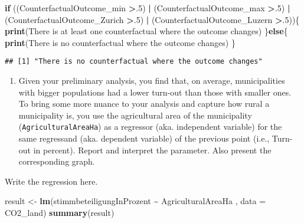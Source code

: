 \documentclass[
]{book}
\newenvironment{Shaded}{\begin{snugshade}}{\end{snugshade}}
\newcommand{\AttributeTok}[1]{\textcolor[rgb]{0.13,0.29,0.53}{#1}}
\newcommand{\ControlFlowTok}[1]{\textcolor[rgb]{0.13,0.29,0.53}{\textbf{#1}}}
\newcommand{\DecValTok}[1]{\textcolor[rgb]{0.00,0.00,0.81}{#1}}
\newcommand{\FunctionTok}[1]{\textcolor[rgb]{0.13,0.29,0.53}{\textbf{#1}}}
\newcommand{\NormalTok}[1]{#1}
\newcommand{\OtherTok}[1]{\textcolor[rgb]{0.56,0.35,0.01}{#1}}
\newcommand{\SpecialCharTok}[1]{\textcolor[rgb]{0.81,0.36,0.00}{\textbf{#1}}}
\newcommand{\StringTok}[1]{\textcolor[rgb]{0.31,0.60,0.02}{#1}}
\providecommand{\tightlist}{%
  \setlength{\itemsep}{0pt}\setlength{\parskip}{0pt}}
\begin{document}
\begin{Shaded}
\begin{Highlighting}[]
\ControlFlowTok{if}\NormalTok{ ((CounterfactualOutcome\_min }\SpecialCharTok{\textgreater{}}\NormalTok{.}\DecValTok{5}\NormalTok{) }\SpecialCharTok{|}\NormalTok{ (CounterfactualOutcome\_max }\SpecialCharTok{\textgreater{}}\NormalTok{.}\DecValTok{5}\NormalTok{) }\SpecialCharTok{|}\NormalTok{ (CounterfactualOutcome\_Zurich }\SpecialCharTok{\textgreater{}}\NormalTok{.}\DecValTok{5}\NormalTok{) }\SpecialCharTok{|}\NormalTok{ (CounterfactualOutcome\_Luzern }\SpecialCharTok{\textgreater{}}\NormalTok{.}\DecValTok{5}\NormalTok{))\{}
  \FunctionTok{print}\NormalTok{(}\StringTok{\textquotesingle{}There is at least one counterfactual where the outcome changes\textquotesingle{}}\NormalTok{)}
\NormalTok{\}}\ControlFlowTok{else}\NormalTok{\{}
  \FunctionTok{print}\NormalTok{(}\StringTok{\textquotesingle{}There is no counterfactual where the outcome changes\textquotesingle{}}\NormalTok{)}
\NormalTok{\}}
\end{Highlighting}
\end{Shaded}

\begin{verbatim}
## [1] "There is no counterfactual where the outcome changes"
\end{verbatim}

\begin{enumerate}
\def\labelenumi{\roman{enumi}.}
\setcounter{enumi}{7}
\tightlist
\item
  Given your preliminary analysis, you find that, on average, municipalities with bigger populations had a lower turn-out than those with smaller ones. To bring some more nuance to your analysis and capture how rural a municipality is, you use the agricultural area of the municipality (\texttt{AgriculturalAreaHa}) as a regressor (aka. independent variable) for the same regressand (aka. dependent variable) of the previous point (i.e., Turn-out in percent). Report and interpret the parameter. Also present the corresponding graph.
\end{enumerate}

Write the regression here.

\begin{Shaded}
\begin{Highlighting}[]
\NormalTok{result }\OtherTok{\textless{}{-}} \FunctionTok{lm}\NormalTok{(stimmbeteiligungInProzent }\SpecialCharTok{\textasciitilde{}}\NormalTok{ AgriculturalAreaHa , }\AttributeTok{data =}\NormalTok{ CO2\_land)}
\FunctionTok{summary}\NormalTok{(result)}
\end{Highlighting}
\end{Shaded}
\end{document}
